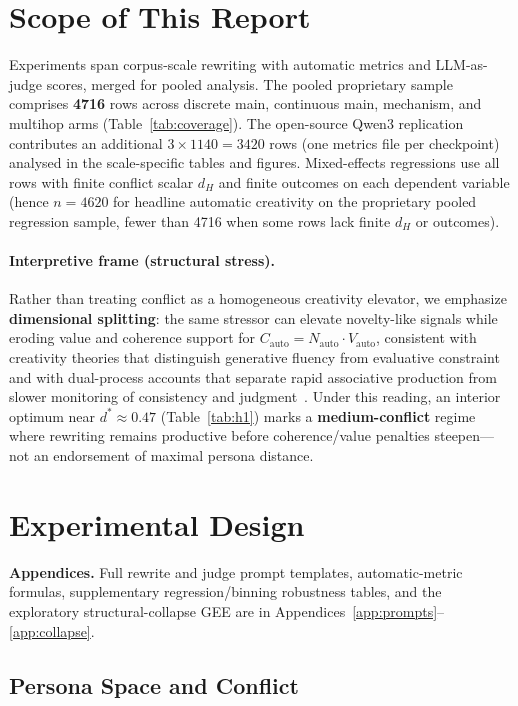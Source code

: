 \documentclass[sigconf,nonacm]{acmart}
\begin{document}
\section{Scope of This Report}

Experiments span corpus-scale rewriting with automatic metrics and LLM-as-judge scores, merged for pooled analysis.
The pooled proprietary sample comprises \textbf{4716} rows across discrete main, continuous main, mechanism, and multihop arms (Table~\ref{tab:coverage}).
The open-source Qwen3 replication contributes an additional $3{\times}1140=3420$ rows (one metrics file per checkpoint) analysed in the scale-specific tables and figures.
Mixed-effects regressions use all rows with finite conflict scalar $d_H$ and finite outcomes on each dependent variable (hence $n{=}4620$ for headline automatic creativity on the proprietary pooled regression sample, fewer than 4716 when some rows lack finite $d_H$ or outcomes).

\paragraph{Interpretive frame (structural stress).}
Rather than treating conflict as a homogeneous creativity elevator, we emphasize \textbf{dimensional splitting}: the same stressor can elevate novelty-like signals while eroding value and coherence support for $C_{\mathrm{auto}}{=}N_{\mathrm{auto}}{\cdot}V_{\mathrm{auto}}$, consistent with creativity theories that distinguish generative fluency from evaluative constraint~\cite{boden} and with dual-process accounts that separate rapid associative production from slower monitoring of consistency and judgment~\cite{kahneman}.
Under this reading, an interior optimum near $d^\ast{\approx}0.47$ (Table~\ref{tab:h1}) marks a \textbf{medium-conflict} regime where rewriting remains productive before coherence/value penalties steepen---not an endorsement of maximal persona distance.

\section{Experimental Design}

\noindent\textbf{Appendices.}
Full rewrite and judge prompt templates, automatic-metric formulas, supplementary regression/binning robustness tables, and the exploratory structural-collapse GEE are in Appendices~\ref{app:prompts}--\ref{app:collapse}.

\subsection{Persona Space and Conflict}
\end{document}
